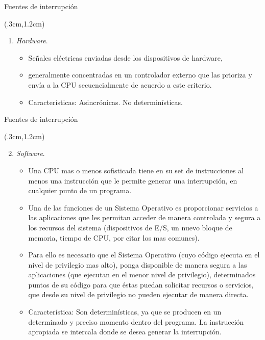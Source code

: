 \documentclass[table,x11names,aspectratio=169]{beamer}
\begin{document}
\begin{frame}{Fuentes de interrupción}
 \begin{textblock*}{\textwidth}(.3cm,1.2cm) 
  \begin{enumerate}
   \item \emph{\color{blue}Hardware}.
   \begin{itemize} \justifying
    \item Señales eléctricas enviadas desde los dispositivos de hardware, 
    \item generalmente concentradas en un controlador externo que las prioriza y envía a la CPU secuencialmente de acuerdo a este criterio. 
    \item Características: Asincrónicas. No determinísticas.
    \end{itemize}
  \end{enumerate}
 \end{textblock*}
\end{frame}
	
\begin{frame}{Fuentes de interrupción}
 \begin{textblock*}{\textwidth}(.3cm,1.2cm) 
  \begin{enumerate} \setcounter{enumi}{1}
   \item \emph{\color{blue}Software}. 
   \begin{itemize} \justifying
    \item Una CPU mas o menos sofisticada tiene en su set de instrucciones al menos una instrucción que le permite generar una interrupción, en cualquier punto de un programa.
    \item Una de las funciones de un Sistema Operativo es proporcionar servicios a las aplicaciones que les permitan acceder de manera controlada y segura a los recursos del sistema (dispositivos de E/S, un nuevo bloque de memoria, tiempo de CPU, por citar los mas comunes).
    \item Para ello es necesario que el Sistema Operativo (cuyo código ejecuta en el nivel de privilegio mas alto), ponga disponible de manera segura a las aplicaciones (que ejecutan en el menor nivel de privilegio), determinados puntos de su código para que éstas puedan solicitar recursos o servicios, que desde su nivel de privilegio no pueden ejecutar de manera directa.
    \item Característica: Son determinísticas, ya que se producen en un determinado y preciso momento dentro del programa. La instrucción apropiada se intercala donde se desea generar la interrupción.
   \end{itemize}
  \end{enumerate}
 \end{textblock*}
\end{frame}
\end{document}
